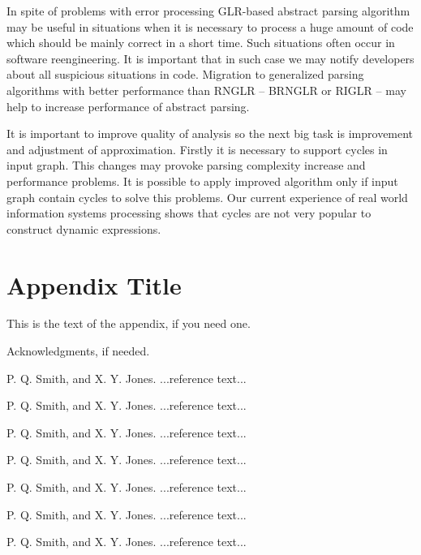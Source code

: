 \documentclass{sigplanconf}
\begin{document}
In spite of problems with error processing GLR-based abstract parsing algorithm may be useful in situations when it is necessary to process a huge amount of code which should be mainly correct in a short time. Such situations often occur in software reengineering. It is important that in such case we may notify developers about all suspicious situations in code. Migration to generalized parsing algorithms with better performance than RNGLR -- BRNGLR or RIGLR -- may help to increase performance of abstract parsing.

It is important to improve quality of analysis so the next big task is improvement and  adjustment of approximation. Firstly it is necessary to support cycles in input graph. This changes may provoke parsing complexity increase and performance problems. It is possible to apply improved algorithm only if input graph contain cycles to solve this problems. Our current experience of real world information systems processing shows that cycles are not very popular to construct dynamic expressions.



\appendix
\section{Appendix Title}

This is the text of the appendix, if you need one.

\acks

Acknowledgments, if needed.





\begin{thebibliography}{}
\softraggedright

P. Q. Smith, and X. Y. Jones. ...reference text...

P. Q. Smith, and X. Y. Jones. ...reference text...

P. Q. Smith, and X. Y. Jones. ...reference text...

P. Q. Smith, and X. Y. Jones. ...reference text...

P. Q. Smith, and X. Y. Jones. ...reference text...

P. Q. Smith, and X. Y. Jones. ...reference text...

P. Q. Smith, and X. Y. Jones. ...reference text...

\end{thebibliography}
\end{document}
